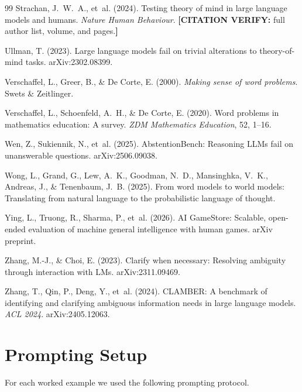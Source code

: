 \documentclass[11pt,letterpaper]{article}
\newcommand{\citeverify}[1]{{\color{orange}\textbf{[CITATION VERIFY:} #1\textbf{]}}}
\begin{document}
\begin{thebibliography}{99}
Strachan, J.~W.~A., et~al. (2024). Testing theory of mind in large language models and humans. \emph{Nature Human Behaviour}. \citeverify{full author list, volume, and pages.}

Ullman, T. (2023). Large language models fail on trivial alterations to theory-of-mind tasks. arXiv:2302.08399.

Verschaffel, L., Greer, B., \& De Corte, E. (2000). \emph{Making sense of word problems}. Swets \& Zeitlinger.

Verschaffel, L., Schoenfeld, A.~H., \& De Corte, E. (2020). Word problems in mathematics education: A survey. \emph{ZDM Mathematics Education}, 52, 1--16.

Wen, Z., Sukiennik, N., et~al. (2025). AbstentionBench: Reasoning LLMs fail on unanswerable questions. arXiv:2506.09038.

Wong, L., Grand, G., Lew, A.~K., Goodman, N.~D., Mansinghka, V.~K., Andreas, J., \& Tenenbaum, J.~B. (2025). From word models to world models: Translating from natural language to the probabilistic language of thought.

Ying, L., Truong, R., Sharma, P., et~al. (2026). AI GameStore: Scalable, open-ended evaluation of machine general intelligence with human games. arXiv preprint.

Zhang, M.-J., \& Choi, E. (2023). Clarify when necessary: Resolving ambiguity through interaction with LMs. arXiv:2311.09469.

Zhang, T., Qin, P., Deng, Y., et~al. (2024). CLAMBER: A benchmark of identifying and clarifying ambiguous information needs in large language models. \emph{ACL 2024}. arXiv:2405.12063.

\end{thebibliography}

\appendix

\section{Prompting Setup}
\label{app:prompting}

For each worked example we used the following prompting protocol.
\end{document}

